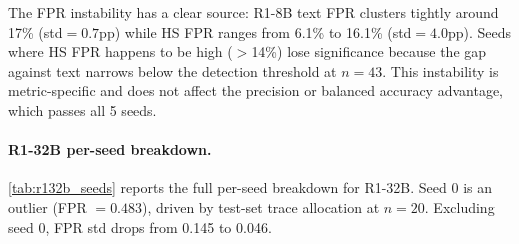\begin{table}[htbp]
\centering
\small
\caption{R1-8B per-metric$\times$seed HB pass rates. Precision is robust (5/5); FPR is fragile (3/5). FPR std across seeds is 0.040 vs.\ text FPR std 0.007, consistent with a proportion near boundary (${\sim}$12\%) amplified at $n{=}43$.}
\label{tab:r18b_metric_hb}
\end{table}

The FPR instability has a clear source: R1-8B text FPR clusters tightly around 17\% (std${=}0.7$pp) while HS FPR ranges from 6.1\% to 16.1\% (std${=}4.0$pp). Seeds where HS FPR happens to be high ($>$14\%) lose significance because the gap against text narrows below the detection threshold at $n{=}43$. This instability is metric-specific and does not affect the precision or balanced accuracy advantage, which passes all 5 seeds.

\paragraph{R1-32B per-seed breakdown.} \cref{tab:r132b_seeds} reports the full per-seed breakdown for R1-32B. Seed 0 is an outlier (FPR $= 0.483$), driven by test-set trace allocation at $n{=}20$. Excluding seed 0, FPR std drops from 0.145 to 0.046.

\begin{table}[htbp]
\centering
\small
\caption{R1-32B per-seed performance (L63, $W{=}1$). Seed 0 is an outlier driven by test-set trace allocation.}
\label{tab:r132b_seeds}
\end{table}


